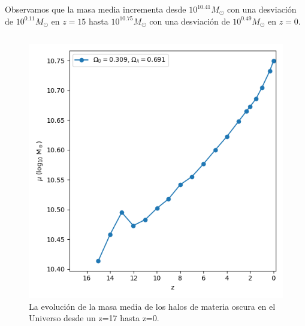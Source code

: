 \documentclass{beamer}
\begin{document}
	\begin{frame}
			\small Observamos que la masa media incrementa desde $10^{10.41}M_\odot$ con una desviación de $10^{0.11}M_\odot$ en $z=15$ hasta $10^{10.75}M_\odot$ con una desviación de $10^{0.49}M_\odot$ en $z=0$.
		\begin{columns}[t]
			\begin{column}{.5\textwidth}
				\begin{figure}
					\centering
					\includegraphics[scale=0.3]{RunCanonica/MassMean_RunCanonica.png}
					\caption{\footnotesize La evolución de la masa media de los halos de materia oscura en el Universo desde un z=17 hasta z=0.}
					\label{fig:Canon-MassMean}
				\end{figure}
			\end{column}
			

\end{columns}
\end{frame}
\end{document}

